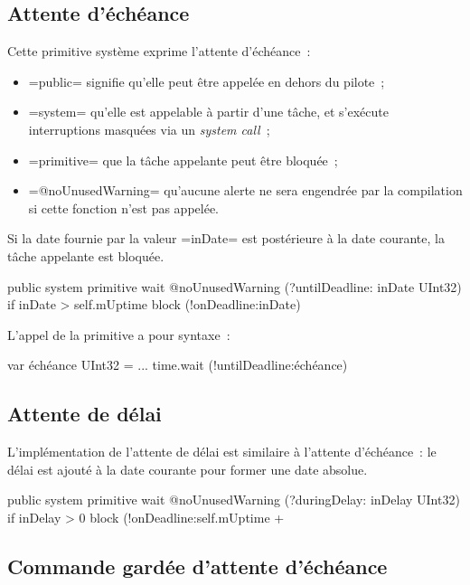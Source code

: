 \subsection{Attente d'échéance}

Cette primitive système exprime l'attente d'échéance~:
\begin{itemize}
  \item \omnibus=public= signifie qu'elle peut être appelée en dehors du pilote~;
  \item \omnibus=system= qu'elle est appelable à partir d'une tâche, et s'exécute interruptions masquées via un \emph{system call}~;
  \item \omnibus=primitive= que la tâche appelante peut être bloquée~;
  \item \omnibus=@noUnusedWarning= qu'aucune alerte ne sera engendrée par la compilation si cette fonction n'est pas appelée.
\end{itemize}

Si la date fournie par la valeur \omnibus=inDate= est postérieure à la date courante, la tâche appelante est bloquée.

\begin{OMNIBUS}
public system primitive
wait @noUnusedWarning (?untilDeadline: inDate UInt32) {
  if inDate > self.mUptime {
    block (!onDeadline:inDate)
  }
}
\end{OMNIBUS}

L'appel de la primitive a pour syntaxe~:
\begin{OMNIBUS}
var échéance UInt32 = ...
time.wait (!untilDeadline:échéance)
\end{OMNIBUS}




\subsection{Attente de délai}

L'implémentation de l'attente de délai est similaire à l'attente d'échéance~: le délai est ajouté à la date courante pour former une date absolue.

\begin{OMNIBUS}
public system primitive
wait @noUnusedWarning (?duringDelay: inDelay UInt32) {
  if inDelay > 0 {
    block (!onDeadline:self.mUptime +%
  }
}
\end{OMNIBUS}


\subsection{Commande gardée d'attente d'échéance}

